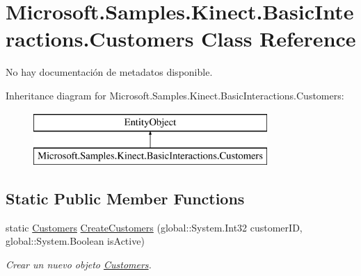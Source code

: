 \hypertarget{class_microsoft_1_1_samples_1_1_kinect_1_1_basic_interactions_1_1_customers}{\section{Microsoft.\-Samples.\-Kinect.\-Basic\-Interactions.\-Customers Class Reference}
\label{class_microsoft_1_1_samples_1_1_kinect_1_1_basic_interactions_1_1_customers}
}


No hay documentación de metadatos disponible.  


Inheritance diagram for Microsoft.\-Samples.\-Kinect.\-Basic\-Interactions.\-Customers\-:\begin{figure}[H]
\begin{center}
\leavevmode
\includegraphics[height=2.000000cm]{class_microsoft_1_1_samples_1_1_kinect_1_1_basic_interactions_1_1_customers}
\end{center}
\end{figure}
\subsection*{Static Public Member Functions}
\begin{DoxyCompactItemize}
\item 
static \hyperlink{class_microsoft_1_1_samples_1_1_kinect_1_1_basic_interactions_1_1_customers}{Customers} \hyperlink{class_microsoft_1_1_samples_1_1_kinect_1_1_basic_interactions_1_1_customers_a03a766039dccad9470ee0b246a8ef8c7}{Create\-Customers} (global\-::\-System.\-Int32 customer\-I\-D, global\-::\-System.\-Boolean is\-Active)
\begin{DoxyCompactList}\small\item\em Crear un nuevo objeto \hyperlink{class_microsoft_1_1_samples_1_1_kinect_1_1_basic_interactions_1_1_customers}{Customers}. \end{DoxyCompactList}\end{DoxyCompactItemize}
